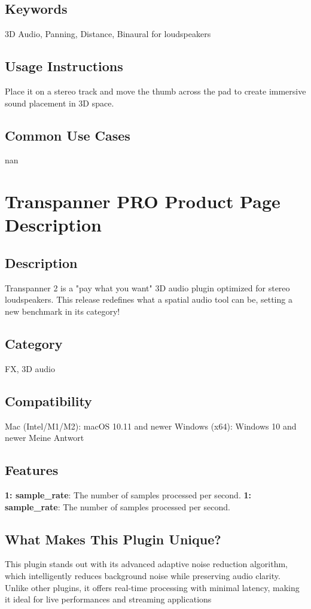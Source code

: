 \documentclass[8pt]{article}
\begin{document}
\subsection*{Keywords}
3D Audio, Panning, Distance, Binaural for loudspeakers

\subsection*{Usage Instructions}
Place it on a stereo track and move the thumb across the pad to create immersive sound placement in 3D space. 

\subsection*{Common Use Cases}
nan

    \section*{Transpanner PRO  Product Page Description}

    \subsection*{Description}
    Transpanner 2 is a "pay what you want" 3D audio plugin optimized for stereo loudspeakers. This release redefines what a spatial audio tool can be, setting a new benchmark in its category!

    \subsection*{Category}
    FX, 3D audio

    \subsection*{Compatibility}
    Mac (Intel/M1/M2): macOS 10.11 and newer
Windows (x64): Windows 10 and newer
Meine Antwort


    \subsection*{Features}
    \textbf{1: sample\_rate}: The number of samples processed per second.
\textbf{1: sample\_rate}: The number of samples processed per second.

    \subsection*{What Makes This Plugin Unique?}
    This plugin stands out with its advanced adaptive noise reduction algorithm, which intelligently reduces background noise while preserving audio clarity. Unlike other plugins, it offers real-time processing with minimal latency, making it ideal for live performances and streaming applications
\end{document}
